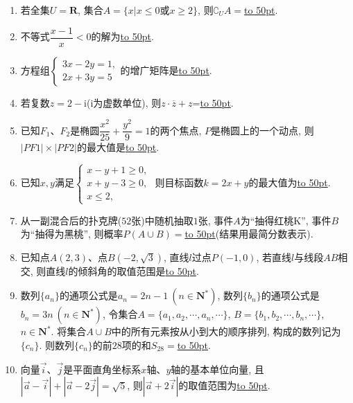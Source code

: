 \documentclass[10pt,a4paper]{article}
\newcommand{\blank}[1]{\underline{\hbox to #1pt{}}}
\begin{document}
\begin{enumerate}[1.]
\item 若全集$U=\mathbf{R}$, 集合$A=\{x|x\le 0\text{或} x\ge 2\}$, 则$\complement_U A=$\blank{50}.
\item 不等式$\dfrac{x-1}x<0$的解为\blank{50}.
\item 方程组$\begin{cases} 3x-2y=1, \\ 2x+3y=5 \end{cases}$的增广矩阵是\blank{50}.
\item 若复数$z=2-\mathrm{i}$($\mathrm{i}$为虚数单位), 则$z\cdot \overline z+z$=\blank{50}.
\item 已知$F_1$、$F_2$是椭圆$\dfrac{x^2}{25}+\dfrac{y^2}9=1$的两个焦点, $P$是椭圆上的一个动点, 则$|PF1|\times |PF2|$的最大值是\blank{50}.
\item 已知$x, y$满足$\begin{cases}x-y+1 \ge 0, \\ x+y-3 \ge 0, \\  x\le 2, \end{cases}$ 则目标函数$k=2x+y$的最大值为\blank{50}.
\item 从一副混合后的扑克牌($52$张)中随机抽取$1$张, 事件$A$为``抽得红桃K'', 事件$B$为``抽得为黑桃'', 则概率$P(A\cup B)=$\blank{50}(结果用最简分数表示).
\item 已知点$A(2,3)$、点$B(-2,\sqrt3)$, 直线$l$过点$P(-1,0)$, 若直线$l$与线段$AB$相交, 则直线$l$的倾斜角的取值范围是\blank{50}.
\item 数列$\{a_n\}$的通项公式是$a_n=2n-1\ (n\in \mathbf{N}^*)$, 数列$\{b_n\}$的通项公式是$b_n=3n \ (n\in \mathbf{N}^*)$, 令集合$A=\{a_1,a_2,\cdots,a_n,\cdots\}$, $B=\{b_1,b_2,\cdots,b_n,\cdots\}$, $n\in \mathbf{N}^*$. 将集合$A\cup B$中的所有元素按从小到大的顺序排列, 构成的数列记为$\{c_n\}$. 则数列$\{c_n\}$的前$28$项的和$S_{28}=$\blank{50}.
\item 向量$\overrightarrow{i}$、$\overrightarrow{j}$是平面直角坐标系$x$轴、$y$轴的基本单位向量, 且$|\overrightarrow a-\overrightarrow i|+|\overrightarrow a-2\overrightarrow j|=\sqrt5$, 则$|\overrightarrow a+2 \overrightarrow i|$的取值范围为\blank{50}.



\end{enumerate}
\end{document}
